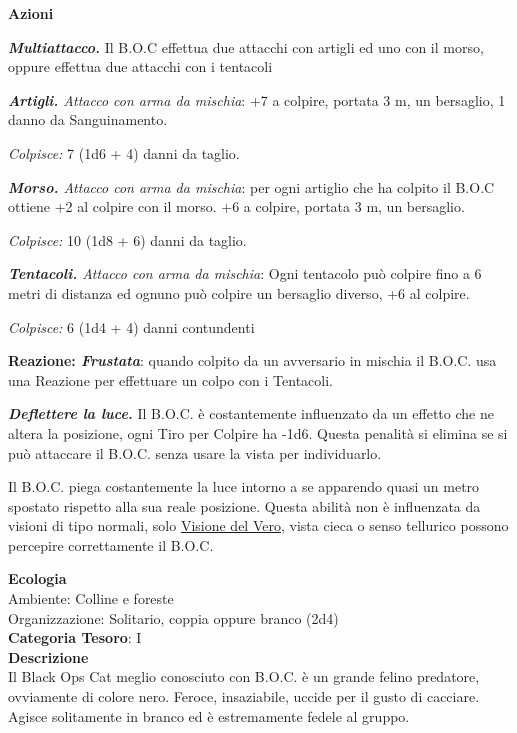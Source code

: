\begin{multicols}{2}
{\textbf{Azioni}

\emph{\textbf{Multiattacco.}} Il B.O.C effettua due attacchi con artigli ed uno con il morso, oppure effettua due attacchi con i tentacoli

\emph{\textbf{Artigli.} Attacco con arma da mischia}: +7 a colpire, portata 3 m, un bersaglio, 1 danno da Sanguinamento.

\emph{Colpisce:} 7 (1d6 + 4) danni da taglio.

\emph{\textbf{Morso.} Attacco con arma da mischia}: per ogni artiglio che ha colpito il B.O.C ottiene +2 al colpire con il morso. +6 a colpire, portata 3 m, un bersaglio.

\emph{Colpisce:} 10 (1d8 + 6) danni da taglio.

\emph{\textbf{Tentacoli.} Attacco con arma da mischia}: Ogni tentacolo può colpire fino a 6 metri di distanza ed ognuno può colpire un bersaglio diverso, +6 al colpire.

\emph{Colpisce:} 6 (1d4 + 4) danni contundenti

\textbf{Reazione: \emph{Frustata}}: quando colpito da un avversario in mischia il B.O.C. usa una Reazione per effettuare un colpo con i Tentacoli.

\emph{\textbf{Deflettere la luce.}} Il B.O.C. è costantemente influenzato da un effetto che ne altera la posizione, ogni Tiro per Colpire ha -1d6. Questa penalità si elimina se si può attaccare il B.O.C. senza usare la vista per individuarlo.

Il B.O.C. piega costantemente la luce intorno a se apparendo quasi un metro spostato rispetto alla sua reale posizione. Questa abilità non è influenzata da visioni di tipo normali, solo \hyperlink{Visione del Vero}{Visione del Vero}, vista cieca o senso tellurico possono percepire correttamente il B.O.C.

\textbf{Ecologia}\\
Ambiente: Colline e foreste\\
Organizzazione: Solitario, coppia oppure branco (2d4)\\
\textbf{Categoria Tesoro}: I\\
\textbf{Descrizione}\\
Il Black Ops Cat meglio conosciuto con B.O.C. è un grande felino predatore, ovviamente di colore nero. Feroce, insaziabile, uccide per il gusto di cacciare. Agisce solitamente in branco ed è estremamente fedele al gruppo.

}
\end{multicols}
